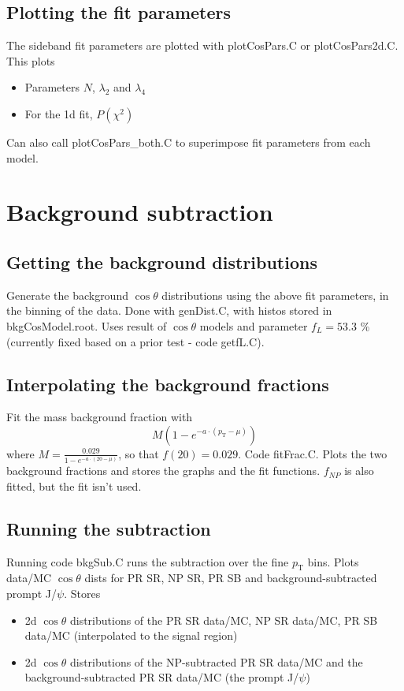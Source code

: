 \documentclass{article}
\newcommand{\pt}{p_\text{T}}
\newcommand{\cost}{\cos\theta}
\begin{document}
\subsection{Plotting the fit parameters}

The sideband fit parameters are plotted with plotCosPars.C or plotCosPars2d.C. This plots 
\begin{itemize}
\item Parameters $N$, $\lambda_2$ and $\lambda_4$ 
\item For the 1d fit, $P(\chi^2)$
\end{itemize}
Can also call plotCosPars\_both.C to superimpose fit parameters from each model.

\pagebreak

\section{Background subtraction}

\subsection{Getting the background distributions}

Generate the background $\cost$ distributions using the above fit parameters, in the binning of the data. Done with genDist.C, with histos stored in bkgCosModel.root. Uses result of $\cost$ models and parameter $f_L = 53.3$ \% (currently fixed based on a prior test - code getfL.C).

\subsection{Interpolating the background fractions}

Fit the mass background fraction with 
\begin{equation}
M\left(1-e^{-a\cdot(\pt-\mu)}\right)
\end{equation}
where $M = \frac{0.029}{1-e^{-a\cdot(20-\mu)}}$, so that $f(20) = 0.029$. Code fitFrac.C. Plots the two background fractions and stores the graphs and the fit functions. $f_{NP}$ is also fitted, but the fit isn't used.

\subsection{Running the subtraction}

Running code bkgSub.C runs the subtraction over the fine $\pt$ bins. Plots data/MC $\cost$ dists for PR SR, NP SR, PR SB and background-subtracted prompt J/$\psi$. Stores
\begin{itemize}
\item 2d $\cost$ distributions of the PR SR data/MC, NP SR data/MC, PR SB data/MC (interpolated to the signal region)
\item 2d $\cost$ distributions of the NP-subtracted PR SR data/MC and the background-subtracted PR SR data/MC (the prompt J/$\psi$)
\end{itemize}
\end{document}

